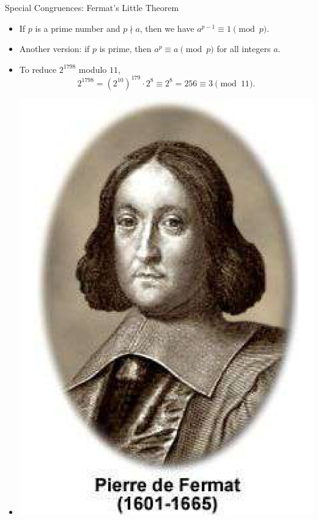\documentclass[ %
 usenames,dvipsnames,
aspectratio=169,11pt ]{beamer}
\newenvironment{stepitemize}{\begin{itemize}[<+->]}{\end{itemize} }
\begin{document}
\begin{frame}{Special Congruences: Fermat's Little Theorem}
\begin{stepitemize}
\item If $p$ is a prime number and $p\nmid a$, then we have $a^{p-1} \equiv 1 \pmod{p}$.
\item Another version: if $p$ is prime, then $a^p\equiv a \pmod{p}$ for all integers $a$.
\item To reduce $2^{1798}$ modulo $11$,
$$2^{1798} = (2^{10})^{179}\cdot 2^8 \equiv 2^8=256\equiv 3 \pmod{11}. $$
\item[]     \begin{center}
    \includegraphics[scale=.180]{fermat.pdf}
\end{center}

\end{stepitemize}
\end{frame}
\end{document}
